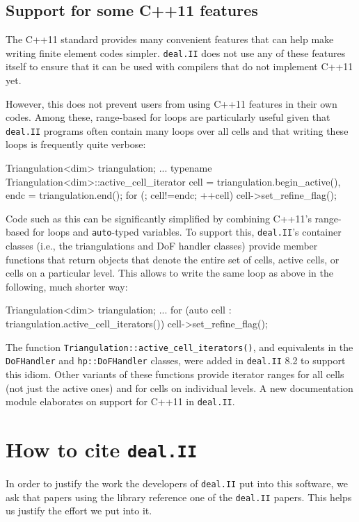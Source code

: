 \documentclass{ansarticle}
\newcommand{\specialword}[1]{\texttt{#1}}
\newcommand{\dealii}{{\specialword{deal.II}}}
\begin{document}
\subsection{Support for some C++11 features}
The C++11 standard \cite{cpp11} provides many convenient features that can
help make writing finite element codes simpler. \dealii{} does not use any of
these features itself to ensure that it can be used with compilers that do not
implement C++11 yet. 

However, this does not prevent users from using C++11
features in their own codes. Among these, range-based for loops are
particularly useful given that \dealii{} programs often contain many loops
over all cells and that writing these loops is frequently quite verbose:
\begin{c++}
  Triangulation<dim> triangulation;
  ...
  typename Triangulation<dim>::active_cell_iterator
    cell = triangulation.begin_active(),
    endc = triangulation.end();
  for (; cell!=endc; ++cell)
    cell->set_refine_flag();
\end{c++}
Code such as this can be significantly simplified by combining C++11's
range-based for loops and \texttt{auto}-typed variables. To support this,
\dealii{}'s container classes (i.e., the triangulations and DoF handler
classes) provide member functions that return objects that denote the entire
set of cells, active cells, or cells on a particular level. This allows to
write the same loop as above in the following, much shorter way:
\begin{c++}
  Triangulation<dim> triangulation;
  ...
  for (auto cell : triangulation.active_cell_iterators())
    cell->set_refine_flag();
\end{c++}
The function
\texttt{Triangulation::active\_cell\_iterators()}, 
and equivalents in the
\texttt{DoFHandler} and
\texttt{hp::DoFHandler} classes, were added in \dealii{} 8.2
to support this idiom.
Other variants of these functions provide iterator ranges
for all cells (not just the active ones) and for cells on individual
levels. A new documentation module elaborates on support for C++11 in
\dealii{}.


\section{How to cite \dealii{}}\label{sec:cite}

In order to justify the work the developers of \dealii{} put into this
software, we ask that papers using the library reference one of the \dealii{}
papers. This helps us justify the effort we put into it.
\end{document}
